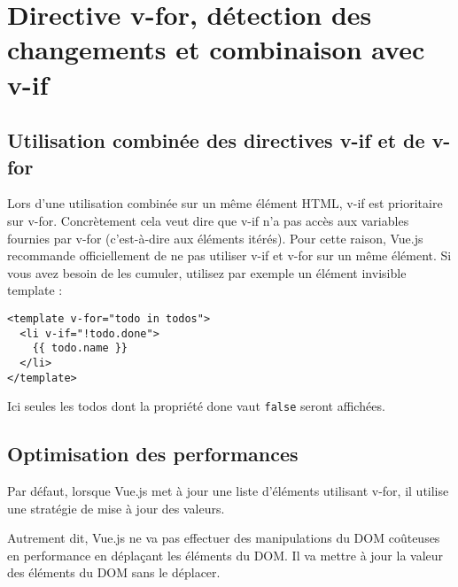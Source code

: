 

\section{Directive v-for, détection des changements et combinaison avec v-if}
\subsection{Utilisation combinée des directives {\color{monOrange}v-if} et de {\color{monOrange}v-for}}
Lors d'une utilisation combinée sur un même élément HTML, {\color{monOrange}v-if} est prioritaire sur {\color{monOrange}v-for}. Concrètement cela veut dire que {\color{monOrange}v-if} n'a pas accès aux variables fournies par {\color{monOrange}v-for} (c'est-à-dire aux éléments itérés). Pour cette raison, {\color{monOrange}Vue.js} recommande officiellement de ne pas utiliser {\color{monOrange}v-if} et {\color{monOrange}v-for} sur un même élément. Si vous avez besoin de les cumuler, utilisez par exemple un élément invisible {\color{monOrange}template} :
\begin{verbatim}
<template v-for="todo in todos">
  <li v-if="!todo.done">
    {{ todo.name }}
  </li>
</template>
\end{verbatim}
Ici seules les {\color{monOrange}todos} dont la propriété {\color{monOrange}done} vaut {\tt false} seront affichées.

\subsection{Optimisation des performances}
Par défaut, lorsque {\color{monOrange}Vue.js} met à jour une liste d'éléments utilisant {\color{monOrange}v-for}, il utilise une stratégie de mise à jour des valeurs.

Autrement dit, {\color{monOrange}Vue.js} ne va pas effectuer des manipulations du DOM coûteuses en performance en déplaçant les éléments du DOM. Il va mettre à jour la valeur des éléments du DOM sans le déplacer.


